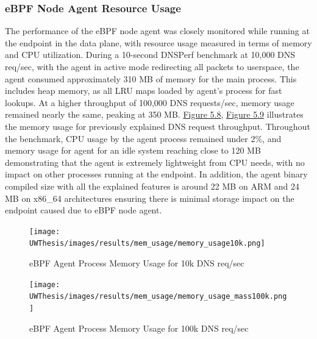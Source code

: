 \documentclass [11pt, proquest] {uwthesis}[2020/02/24]
\begin{document}
\subsubsection{eBPF Node Agent Resource Usage}
The performance of the eBPF node agent was closely monitored while running at the endpoint in the data plane, with resource usage measured in terms of memory and CPU utilization. During a 10-second DNSPerf benchmark at 10,000 DNS req/sec, with the agent in active mode redirecting all packets to userspace, the agent consumed approximately 310 MB of memory for the main process. This includes heap memory, as all LRU maps loaded by agent's process for fast lookups. At a higher throughput of 100,000 DNS requests/sec, memory usage remained nearly the same, peaking at 350 MB. \hyperref[fig:mem10k]{Figure 5.8},  \hyperref[fig:mem100k]{Figure 5.9} illustrates the memory usage for previously explained DNS request throughput. Throughout the benchmark, CPU usage by the agent process remained under 2\%, and memory usage for agent for an idle system reaching close to 120 MB demonstrating that the agent is extremely lightweight from CPU needs, with no impact on other processes running at the endpoint. In addition, the agent binary compiled size with all the  explained features is around 22 MB on ARM and 24 MB on x86\_64 architectures ensuring there is minimal storage impact on the endpoint caused due to eBPF node agent.

\begin{figure}[H]
  \centering
  \begin{minipage}[b]{0.48\textwidth}
    \centering
    \texttt{[image: UWThesis/images/results/mem\_usage/memory\_usage10k.png]}
    \caption{eBPF Agent Process Memory Usage for 10k DNS req/sec}
    \label{fig:mem10k}
  \end{minipage}
  \hfill
  \begin{minipage}[b]{0.48\textwidth}
    \centering
    \texttt{[image: UWThesis/images/results/mem\_usage/memory\_usage\_mass100k.png]}
    \caption{eBPF Agent Process Memory Usage for 100k DNS req/sec}
    \label{fig:mem100k}
  \end{minipage}
\end{figure}
\end{document}
